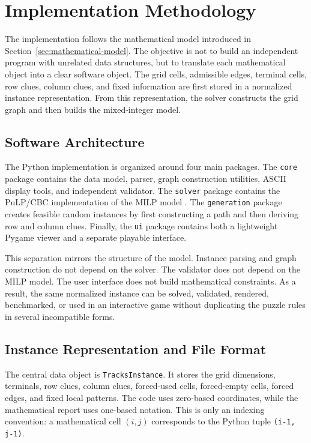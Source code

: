 \section{Implementation Methodology}
\label{sec:methodology}

The implementation follows the mathematical model introduced in
Section~\ref{sec:mathematical-model}. The objective is not to build an
independent program with unrelated data structures, but to translate each
mathematical object into a clear software object. The grid cells, admissible
edges, terminal cells, row clues, column clues, and fixed information are first
stored in a normalized instance representation. From this representation, the
solver constructs the grid graph and then builds the mixed-integer model.

\subsection{Software Architecture}

The Python implementation is organized around four main packages. The
\texttt{core} package contains the data model, parser, graph construction
utilities, ASCII display tools, and independent validator. The \texttt{solver}
package contains the PuLP/CBC implementation of the MILP model
\cite{python,pulp}. The \texttt{generation} package creates feasible random
instances by first constructing a path and then deriving row and column clues.
Finally, the \texttt{ui} package contains both a lightweight Pygame viewer and
a separate playable interface.

This separation mirrors the structure of the model. Instance parsing and graph
construction do not depend on the solver. The validator does not depend on the
MILP model. The user interface does not build mathematical constraints. As a
result, the same normalized instance can be solved, validated, rendered,
benchmarked, or used in an interactive game without duplicating the puzzle
rules in several incompatible forms.

\subsection{Instance Representation and File Format}

The central data object is \texttt{TracksInstance}. It stores the grid
dimensions, terminals, row clues, column clues, forced-used cells,
forced-empty cells, forced edges, and fixed local patterns. The code uses
zero-based coordinates, while the mathematical report uses one-based notation.
This is only an indexing convention: a mathematical cell \((i,j)\) corresponds
to the Python tuple \texttt{(i-1, j-1)}.

